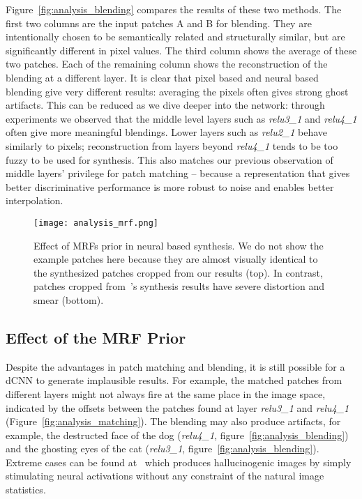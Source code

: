 \documentclass[10pt,twocolumn,letterpaper]{article}
\begin{document}
Figure~\ref{fig:analysis_blending} compares the results of these two methods. The first two columns are the input patches A and B for blending. They are intentionally chosen to be semantically related and structurally similar, but are significantly different in pixel values. The third column shows the average of these two patches. Each of the remaining column shows the reconstruction of the blending at a different layer. It is clear that pixel based and neural based blending give very different results: averaging the pixels often gives strong ghost artifacts. This can be reduced as we dive deeper into the network: through experiments we observed that the middle level layers such as \textit{relu3\_1} and \textit{relu4\_1} often give more meaningful blendings. Lower layers such as \textit{relu2\_1} behave similarly to pixels; reconstruction from layers beyond \textit{relu4\_1} tends to be too fuzzy to be used for synthesis. This also matches our previous observation of middle layers' privilege for patch matching -- because a representation that gives better discriminative performance is more robust to noise and enables better interpolation.

\begin{figure}[t]
	\centering
	\texttt{[image: analysis\_mrf.png]}
	\caption{Effect of MRFs prior in neural based synthesis. We do not show the example patches here because they are almost visually identical to the synthesized patches cropped from our results (top). In contrast, patches cropped from~\cite{Gatys15}'s synthesis results have severe distortion and smear (bottom).}\label{fig:analysis_mrf}
\end{figure}

\subsection{Effect of the MRF Prior}
Despite the advantages in patch matching and blending, it is still possible for a dCNN to generate implausible results. For example, the matched patches from different layers might not always fire at the same place in the image space, indicated by the offsets between the patches found at layer 
\textit{relu3\_1} and \textit{relu4\_1} (Figure~\ref{fig:analysis_matching}). The blending may also produce artifacts, for example, the destructed face of the dog (\textit{relu4\_1}, figure~\ref{fig:analysis_blending}) and the ghosting eyes of the cat (\textit{relu3\_1}, figure~\ref{fig:analysis_blending}). Extreme cases can be found at~\cite{Mordvintsev15} which produces hallucinogenic images by simply stimulating neural activations without any constraint of the natural image statistics.
\end{document}
